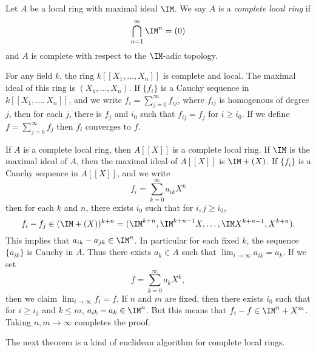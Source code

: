 Let $A$ be a local ring with maximal ideal $\IM$. We say $A$ is a \emph{complete local ring} if
%
\[ \bigcap_{n = 1}^\infty \IM^n = (0) \]
%
and $A$ is complete with respect to the $\IM$-adic topology.

\begin{example}
    For any field $k$, the ring $k[[X_1,\dots,X_n]]$ is complete and local. The maximal ideal of this ring is $(X_1,\dots,X_n)$. If $\{ f_i \}$ is a Cauchy sequence in $k[[X_1,\dots,X_n]]$, and we write $f_i = \sum_{j = 0}^\infty f_{ij}$, where $f_{ij}$ is homogenous of degree $j$, then for each $j$, there is $f_j$ and $i_0$ such that $f_{ij} = f_j$ for $i \geq i_0$. If we define $f = \sum_{j = 0}^\infty f_j$ then $f_i$ converges to $f$.
\end{example}

\begin{example}
    If $A$ is a complete local ring, then $A[[X]]$ is a complete local ring. If $\IM$ is the maximal ideal of $A$, then the maximal ideal of $A[[X]]$ is $\IM + (X)$. If $\{ f_i \}$ is a Cauchy sequence in $A[[X]]$, and we write
    \[ f_i = \sum_{k = 0}^\infty a_{ik} X^k \]
    then for each $k$ and $n$, there exists $i_0$ such that for $i,j \geq i_0$,
    \[ f_i - f_j \in (\IM + (X))^{k+n} = (\IM^{k+n}, \IM^{k+n-1} X, \dots, \IM X^{k+n-1}, X^{k+n}). \]
    This implies that $a_{ik} - a_{jk} \in \IM^n$. In particular for each fixed $k$, the sequence $\{ a_{ik} \}$ is Cauchy in $A$. Thus there exists $a_k \in A$ such that $\lim_{i \to \infty} a_{ik} = a_k$. If we set
    \[ f = \sum_{k = 0}^\infty a_k X^k, \]
    then we claim $\lim_{i \to \infty} f_i = f$. If $n$ and $m$ are fixed, then there exists $i_0$ such that for $i \geq i_0$ and $k \leq m$, $a_{ik} - a_k \in \IM^n$. But this means that $f_i - f \in \IM^n + X^m$. Taking $n,m \to \infty$ completes the proof.
\end{example}

The next theorem is a kind of euclidean algorithm for complete local rings.


